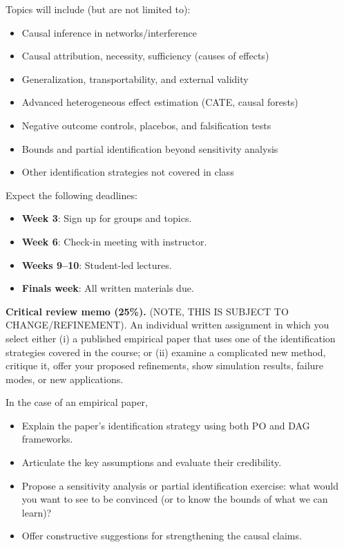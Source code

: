 \documentclass[PS]{syllabus}
\begin{document}
\begin{syllabus}
Topics will include (but are not limited to):
\begin{itemize}
\item Causal inference in networks/interference
\item Causal attribution, necessity, sufficiency (causes of effects)
\item Generalization, transportability, and external validity
\item Advanced heterogeneous effect estimation (CATE, causal forests)
\item Negative outcome controls, placebos, and falsification tests
\item Bounds and partial identification beyond sensitivity analysis
\item Other identification strategies not covered in class
\end{itemize}

Expect the following deadlines:
\begin{itemize}
\item \textbf{Week 3}: Sign up for groups and topics.
\item \textbf{Week 6}: Check-in meeting with instructor.
\item \textbf{Weeks 9--10}: Student-led lectures.
\item \textbf{Finals week}: All written materials due.
\end{itemize}

\textbf{Critical review memo (25\%).} (NOTE, THIS IS SUBJECT TO CHANGE/REFINEMENT). An individual written assignment in which you select either (i) a published empirical paper that uses one of the identification strategies covered in the course; or (ii) examine a complicated new method, critique it, offer your proposed refinements, show simulation results, failure modes, or new applications. 

In the case of an empirical paper,
\begin{itemize}
\item Explain the paper's identification strategy using both PO and DAG frameworks.
\item Articulate the key assumptions and evaluate their credibility.
\item Propose a sensitivity analysis or partial identification exercise: what would you want to see to be convinced (or to know the bounds of what we can learn)?
\item Offer constructive suggestions for strengthening the causal claims.
\end{itemize}


\end{syllabus}
\end{document}
